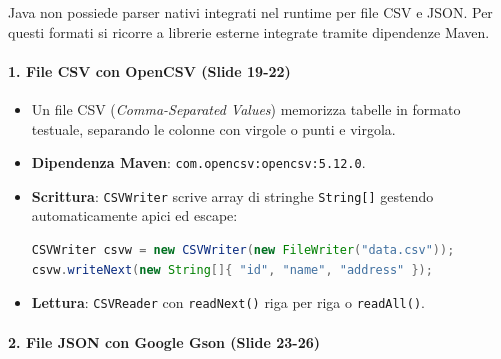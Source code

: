 \documentclass[11pt,a4paper]{article}
\newcommand{\passthrough}[1]{#1}
\begin{document}
Java non possiede parser nativi integrati nel runtime per file CSV e
JSON. Per questi formati si ricorre a librerie esterne integrate tramite
dipendenze Maven.

\paragraph{1. File CSV con OpenCSV (Slide
19-22)}\label{file-csv-con-opencsv-slide-19-22}

\begin{itemize}
\item
  Un file CSV (\emph{Comma-Separated Values}) memorizza tabelle in
  formato testuale, separando le colonne con virgole o punti e virgola.
\item
  \textbf{Dipendenza Maven}:
  \passthrough{\lstinline!com.opencsv:opencsv:5.12.0!}.
\item
  \textbf{Scrittura}: \passthrough{\lstinline!CSVWriter!} scrive array
  di stringhe \passthrough{\lstinline!String[]!} gestendo
  automaticamente apici ed escape:

\begin{lstlisting}[language=Java]
CSVWriter csvw = new CSVWriter(new FileWriter("data.csv"));
csvw.writeNext(new String[]{ "id", "name", "address" });
\end{lstlisting}
\item
  \textbf{Lettura}: \passthrough{\lstinline!CSVReader!} con
  \passthrough{\lstinline!readNext()!} riga per riga o
  \passthrough{\lstinline!readAll()!}.
\end{itemize}

\paragraph{2. File JSON con Google Gson (Slide
23-26)}\label{file-json-con-google-gson-slide-23-26}
\end{document}
